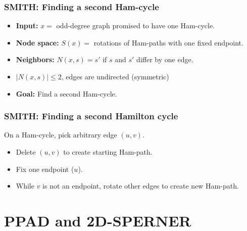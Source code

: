 \documentclass[10pt]{beamer}
\begin{document}
\begin{frame}
\frametitle{SMITH: Finding a second Ham-cycle}

\begin{itemize}
\item \textbf{Input:} $x =$ odd-degree graph promised to have one Ham-cycle.
\item \textbf{Node space:} $S(x) = $ rotations of Ham-paths with one fixed endpoint.
\item \textbf{Neighbors:} $N(x,s) = s'$ if $s$ and $s'$ differ by one edge.
\item $|N(x,s)| \le 2$, edges are undirected (symmetric)
\item \textbf{Goal:} Find a second Ham-cycle.
\end{itemize}

\begin{figure}[hbt]
  
  \centerline{\box\graph}
\end{figure}

\end{frame}

\begin{frame}
\frametitle{SMITH: Finding a second Hamilton cycle}

On a Ham-cycle, pick arbitrary edge $(u,v)$.

\begin{itemize}
\item Delete $(u,v)$ to create starting Ham-path.
\item Fix one endpoint ($u$).
\item While $v$ is not an endpoint, rotate other edges to create new Ham-path.
\end{itemize}

\begin{figure}[hbt]
  
  \centerline{\box\graph}
\end{figure}

\end{frame}

\section{PPAD and 2D-SPERNER}
\end{document}
